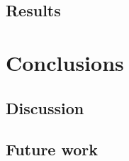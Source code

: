 \documentclass[english, 12pt, a4paper, elec, utf8, a-2b, online]{aaltothesis}
\begin{document}
\subsection{Results}
\clearpage
\section{Conclusions}
\label{sec:summary}

\subsection{Discussion}

\subsection{Future work}

\clearpage
\printbibliography[heading=bibintoc] %
\end{document}
